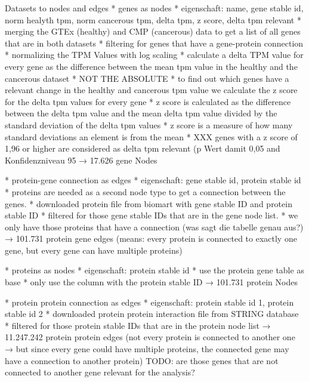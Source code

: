 {\color{lightgray}

Datasets to nodes and edges
    * genes as nodes
        * eigenschaft: name, gene stable id, norm healyth tpm, norm cancerous tpm, delta tpm, z score, delta tpm relevant
        * merging the GTEx (healthy) and CMP (cancerous) data to get a list of all genes that are in both datasets
        * filtering for genes that have a gene-protein connection
        * normalizing the TPM Values with log scaling
        * calculate a delta TPM value for every gene as the difference between the mean tpm value in the healthy and the cancerous dataset
        * NOT THE ABSOLUTE
        * to find out which genes have a relevant change in the healthy and cancerous tpm value we calculate the z score for the delta tpm values for every gene
        * z score is calculated as the difference between the delta tpm value and the mean delta tpm value divided by the standard deviation of the delta tpm values
        * z score is a measure of how many standard deviations an element is from the mean
        * XXX genes with a z score of 1,96 or higher are considered as delta tpm relevant (p Wert damit 0,05 and Konfidenzniveau 95%
    → 17.626 gene Nodes

    * protein-gene connection as edges
        * eigenschaft: gene stable id, protein stable id
        * proteins are needed as a second node type to get a connection between the genes.
        * downloaded protein file from biomart with gene stable ID and protein stable ID
        * filtered for those gene stable IDs that are in the gene node list.
        * we only have those proteins that have a connection (was sagt die tabelle genau aus?)
    → 101.731 protein gene edges (means: every protein is connected to exactly one gene, but every gene can have multiple proteins)

    * proteins as nodes
        * eigenschaft: protein stable id
        * use the protein gene table as base
        * only use the column with the protein stable ID
    → 101.731 protein Nodes

    * protein protein connection as edges
        * eigenschaft: protein stable id 1, protein stable id 2
        * downloaded protein protein interaction file from STRING database
        * filtered for those protein stable IDs that are in the protein node list
    → 11.247.242 protein protein edges
    (not every protein is connected to another one → but since every gene could have multiple proteins, the connected gene may have a connection to another protein)
    TODO: are those genes that are not connected to another gene relevant for the analysis?

}